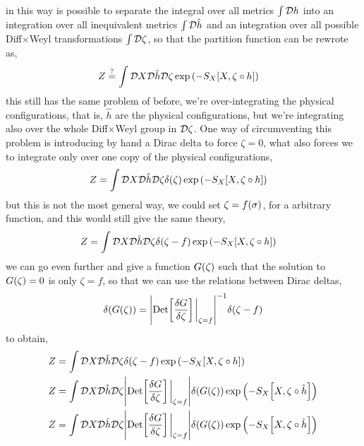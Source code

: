 in this way is possible to separate the integral over all metrics $\int\mathcal D h$ into an integration over all inequivalent metrics $\int\mathcal D \hat h$ 
and an integration over all possible Diff$\times$Weyl transformations $\int\mathcal D \zeta$, so that the partition function can be rewrote as,
\begin{align*}
    Z&\stackrel{?}{=}\int\mathcal D X\mathcal D \hat h\mathcal D \zeta\exp\qty(-S_X\qty[X,\zeta\circ h])
\end{align*}
this still has the same problem of before, we're over-integrating the physical configurations, that is, $\hat h$ are the physical configurations, 
but we're integrating also over the whole Diff$\times$Weyl group in $\mathcal D \zeta$. One way of circumventing this problem is introducing by 
hand a Dirac delta to force $\zeta=0$, what also forces we to integrate only over one copy of the physical configurations,
\begin{align*}
    Z&=\int\mathcal D X\mathcal D \hat h\mathcal D \zeta\delta\qty(\zeta)\exp\qty(-S_X\qty[X,\zeta\circ h])
\end{align*}
but this is not the most general way, we could set $\zeta=f\qty(\sigma)$, for a arbitrary function, and this would still give the same theory,
\begin{align*}
    Z&=\int\mathcal D X\mathcal D \hat h\mathcal D \zeta\delta\qty(\zeta-f)\exp\qty(-S_X\qty[X,\zeta\circ h])
\end{align*}
we can go even further and give a function $G\qty(\zeta)$ such that the solution to $G\qty(\zeta)=0$ is only $\zeta=f$, so that we can use the relations between 
Dirac deltas,
\begin{align*}
    \delta\qty(G\qty(\zeta))=\abs{\Det\qty[\fdv{G}{\zeta}]\eval_{\zeta=f}}^{-1}\delta\qty(\zeta-f)
\end{align*}
to obtain,
\begin{align*}
    Z&=\int\Dd{X}\Dd{\hat h}\Dd{\zeta}\delta\qty(\zeta-f)\exp\qty(-S_X\qty[X,\zeta\circ h])\\
    Z&=\int\Dd{X}\Dd{\hat h}\Dd{\zeta}\abs{\Det\qty[\fdv{G}{\zeta}]\eval_{\zeta=f}}\delta\qty(G\qty(\zeta))\exp\qty(-S_X\qty[X,\zeta\circ \hat h])\\
    Z&=\int\Dd{X}\Dd{\hat h}\Dd{\zeta}\abs{\Det\qty[\fdv{G}{\zeta}]\eval_{\zeta=f}}\delta\qty(G\qty(\zeta))\exp\qty(-S_X\qty[X,\zeta\circ \hat h])
\end{align*}

